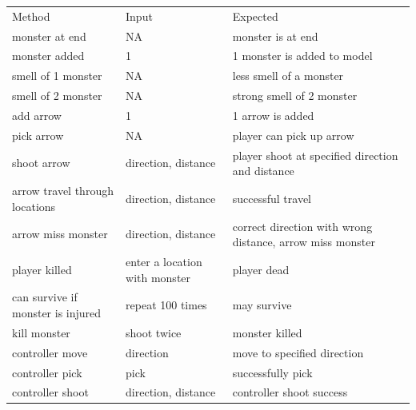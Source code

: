 \documentclass[12pt]{amsart}
\begin{document}
\newpage

\begin{table}[htbp]
   \begin{tabular}{@{} lll @{}} %

      Method     & Input & Expected \\
         monster at end   & NA    &  monster is at end \\
         monster added & 1 &  1 monster is added to model\\
         smell of 1 monster & NA & less smell of a monster\\
         smell of 2 monster & NA & strong smell of 2 monster\\
         add arrow & 1 & 1 arrow is added\\
         pick arrow & NA & player can pick up arrow\\
         shoot arrow & direction, distance & player shoot  at specified direction and distance\\
         arrow travel through locations & direction, distance & successful travel\\
         arrow miss monster & direction, distance & correct direction with wrong distance, arrow miss monster\\
         player killed & enter a location with monster & player dead\\
         can survive if monster is injured & repeat 100 times  & may survive\\
         kill monster & shoot twice & monster killed\\
         controller move & direction & move to specified direction\\
         controller pick & pick & successfully pick\\
         controller shoot & direction, distance & controller shoot success\\
         
    \end{tabular}
\end{table}
\end{document}
